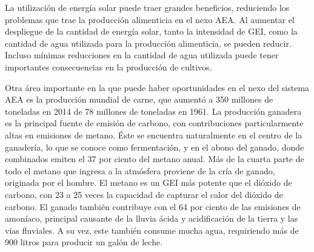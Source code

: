 \documentclass[runningheads]{llncs}
\begin{document}
La utilización de energía solar puede traer grandes beneficios, reduciendo los  problemas que trae la producción alimenticia en el nexo AEA. Al aumentar el despliegue de la cantidad de energía solar, tanto la intensidad de GEI, como la cantidad de agua utilizada para la producción alimenticia, se pueden reducir. Incluso mínimas reducciones en la cantidad de agua utilizada puede tener importantes consecuencias en la producción de cultivos.\\ \par
Otra área importante en la que puede haber oportunidades en el nexo del sistema AEA es la producción mundial de carne, que aumentó a 350 millones de toneladas en 2014 de 78 millones de toneladas en 1961. La producción ganadera es la principal fuente de emisión de carbono, con contribuciones particularmente altas en emisiones de metano. Éste se encuentra naturalmente en el centro de la ganadería, lo que se conoce como fermentación, y en el abono del ganado, donde combinados emiten el 37 por ciento del metano anual. Más de la cuarta parte de todo el metano que ingresa a la atmósfera proviene de la cría de ganado, originada por el hombre. El metano es un GEI más potente que el dióxido de carbono, con 23 a 25 veces la capacidad de capturar el calor del dióxido de carbono. El ganado también contribuye con el 64 por ciento de las emisiones de amoníaco, principal causante de la lluvia ácida y acidificación de la tierra y las vías fluviales. A  su vez, este también consume mucha agua, requiriendo más de 900 litros para producir un galón de leche.
\end{document}
